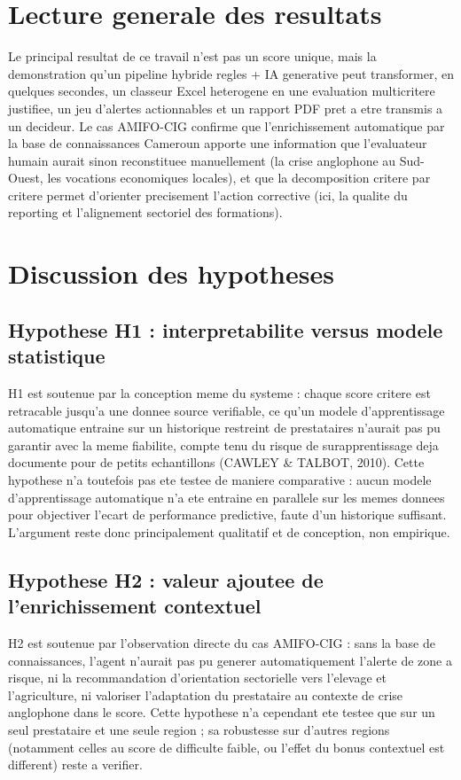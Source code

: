 \documentclass[12pt,a4paper,twoside,openany]{report}
\begin{document}
\section{Lecture generale des resultats}

Le principal resultat de ce travail n'est pas un score unique, mais la demonstration qu'un pipeline hybride regles + IA generative peut transformer, en quelques secondes, un classeur Excel heterogene en une evaluation multicritere justifiee, un jeu d'alertes actionnables et un rapport PDF pret a etre transmis a un decideur. Le cas AMIFO-CIG confirme que l'enrichissement automatique par la base de connaissances Cameroun apporte une information que l'evaluateur humain aurait sinon reconstituee manuellement (la crise anglophone au Sud-Ouest, les vocations economiques locales), et que la decomposition critere par critere permet d'orienter precisement l'action corrective (ici, la qualite du reporting et l'alignement sectoriel des formations).

\section{Discussion des hypotheses}

\subsection{Hypothese H1 : interpretabilite versus modele statistique}

H1 est soutenue par la conception meme du systeme : chaque score critere est retracable jusqu'a une donnee source verifiable, ce qu'un modele d'apprentissage automatique entraine sur un historique restreint de prestataires n'aurait pas pu garantir avec la meme fiabilite, compte tenu du risque de surapprentissage deja documente pour de petits echantillons (CAWLEY \& TALBOT, 2010). Cette hypothese n'a toutefois pas ete testee de maniere comparative : aucun modele d'apprentissage automatique n'a ete entraine en parallele sur les memes donnees pour objectiver l'ecart de performance predictive, faute d'un historique suffisant. L'argument reste donc principalement qualitatif et de conception, non empirique.

\subsection{Hypothese H2 : valeur ajoutee de l'enrichissement contextuel}

H2 est soutenue par l'observation directe du cas AMIFO-CIG : sans la base de connaissances, l'agent n'aurait pas pu generer automatiquement l'alerte de zone a risque, ni la recommandation d'orientation sectorielle vers l'elevage et l'agriculture, ni valoriser l'adaptation du prestataire au contexte de crise anglophone dans le score. Cette hypothese n'a cependant ete testee que sur un seul prestataire et une seule region ; sa robustesse sur d'autres regions (notamment celles au score de difficulte faible, ou l'effet du bonus contextuel est different) reste a verifier.
\end{document}
